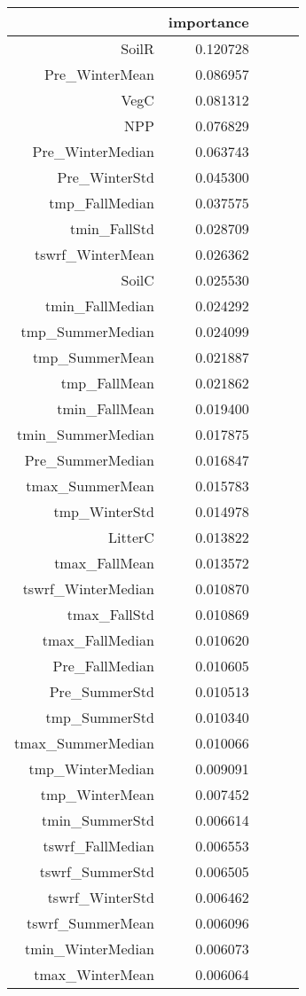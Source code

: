\begin{tabular}{rrrrr}
\toprule
 & importance \\
\midrule
SoilR & 0.120728 \\
Pre_WinterMean & 0.086957 \\
VegC & 0.081312 \\
NPP & 0.076829 \\
Pre_WinterMedian & 0.063743 \\
Pre_WinterStd & 0.045300 \\
tmp_FallMedian & 0.037575 \\
tmin_FallStd & 0.028709 \\
tswrf_WinterMean & 0.026362 \\
SoilC & 0.025530 \\
tmin_FallMedian & 0.024292 \\
tmp_SummerMedian & 0.024099 \\
tmp_SummerMean & 0.021887 \\
tmp_FallMean & 0.021862 \\
tmin_FallMean & 0.019400 \\
tmin_SummerMedian & 0.017875 \\
Pre_SummerMedian & 0.016847 \\
tmax_SummerMean & 0.015783 \\
tmp_WinterStd & 0.014978 \\
LitterC & 0.013822 \\
tmax_FallMean & 0.013572 \\
tswrf_WinterMedian & 0.010870 \\
tmax_FallStd & 0.010869 \\
tmax_FallMedian & 0.010620 \\
Pre_FallMedian & 0.010605 \\
Pre_SummerStd & 0.010513 \\
tmp_SummerStd & 0.010340 \\
tmax_SummerMedian & 0.010066 \\
tmp_WinterMedian & 0.009091 \\
tmp_WinterMean & 0.007452 \\
tmin_SummerStd & 0.006614 \\
tswrf_FallMedian & 0.006553 \\
tswrf_SummerStd & 0.006505 \\
tswrf_WinterStd & 0.006462 \\
tswrf_SummerMean & 0.006096 \\
tmin_WinterMedian & 0.006073 \\
tmax_WinterMean & 0.006064 \\

\end{tabular}
